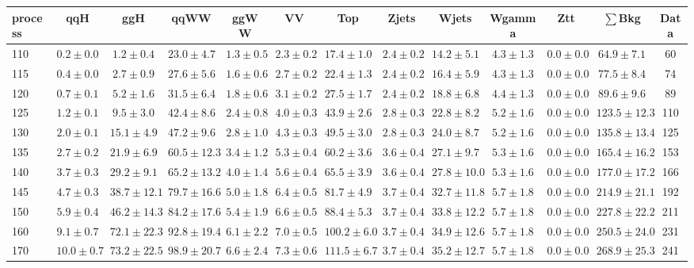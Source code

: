 \begin{table}
{%
 \tiny
 \begin{center}
 \begin{tabular}{l | c c | c c c c c c c c  | c c}
 \hline
 process & qqH & ggH & qqWW & ggWW & VV & Top & Zjets & Wjets & Wgamma & Ztt & $\sum$Bkg & Data \\
 \hline
110 & $0.2\pm0.0$ & $1.2\pm0.4$ & $23.0\pm4.7$ & $1.3\pm0.5$ & $2.3\pm0.2$ & $17.4\pm1.0$ & $2.4\pm0.2$ & $14.2\pm5.1$ & $4.3\pm1.3$ & $0.0\pm0.0$ & $64.9\pm7.1$ & 60 \\
115 & $0.4\pm0.0$ & $2.7\pm0.9$ & $27.6\pm5.6$ & $1.6\pm0.6$ & $2.7\pm0.2$ & $22.4\pm1.3$ & $2.4\pm0.2$ & $16.4\pm5.9$ & $4.3\pm1.3$ & $0.0\pm0.0$ & $77.5\pm8.4$ & 74 \\
120 & $0.7\pm0.1$ & $5.2\pm1.6$ & $31.5\pm6.4$ & $1.8\pm0.6$ & $3.1\pm0.2$ & $27.5\pm1.7$ & $2.4\pm0.2$ & $18.8\pm6.8$ & $4.4\pm1.3$ & $0.0\pm0.0$ & $89.6\pm9.6$ & 89 \\
125 & $1.2\pm0.1$ & $9.5\pm3.0$ & $42.4\pm8.6$ & $2.4\pm0.8$ & $4.0\pm0.3$ & $43.9\pm2.6$ & $2.8\pm0.3$ & $22.8\pm8.2$ & $5.2\pm1.6$ & $0.0\pm0.0$ & $123.5\pm12.3$ & 110 \\
130 & $2.0\pm0.1$ & $15.1\pm4.9$ & $47.2\pm9.6$ & $2.8\pm1.0$ & $4.3\pm0.3$ & $49.5\pm3.0$ & $2.8\pm0.3$ & $24.0\pm8.7$ & $5.2\pm1.6$ & $0.0\pm0.0$ & $135.8\pm13.4$ & 125 \\
135 & $2.7\pm0.2$ & $21.9\pm6.9$ & $60.5\pm12.3$ & $3.4\pm1.2$ & $5.3\pm0.4$ & $60.2\pm3.6$ & $3.6\pm0.4$ & $27.1\pm9.7$ & $5.3\pm1.6$ & $0.0\pm0.0$ & $165.4\pm16.2$ & 153 \\
140 & $3.7\pm0.3$ & $29.2\pm9.1$ & $65.2\pm13.2$ & $4.0\pm1.4$ & $5.6\pm0.4$ & $65.5\pm3.9$ & $3.6\pm0.4$ & $27.8\pm10.0$ & $5.3\pm1.6$ & $0.0\pm0.0$ & $177.0\pm17.2$ & 166 \\
145 & $4.7\pm0.3$ & $38.7\pm12.1$ & $79.7\pm16.6$ & $5.0\pm1.8$ & $6.4\pm0.5$ & $81.7\pm4.9$ & $3.7\pm0.4$ & $32.7\pm11.8$ & $5.7\pm1.8$ & $0.0\pm0.0$ & $214.9\pm21.1$ & 192 \\
150 & $5.9\pm0.4$ & $46.2\pm14.3$ & $84.2\pm17.6$ & $5.4\pm1.9$ & $6.6\pm0.5$ & $88.4\pm5.3$ & $3.7\pm0.4$ & $33.8\pm12.2$ & $5.7\pm1.8$ & $0.0\pm0.0$ & $227.8\pm22.2$ & 211 \\
160 & $9.1\pm0.7$ & $72.1\pm22.3$ & $92.8\pm19.4$ & $6.1\pm2.2$ & $7.0\pm0.5$ & $100.2\pm6.0$ & $3.7\pm0.4$ & $34.9\pm12.6$ & $5.7\pm1.8$ & $0.0\pm0.0$ & $250.5\pm24.0$ & 231 \\
170 & $10.0\pm0.7$ & $73.2\pm22.5$ & $98.9\pm20.7$ & $6.6\pm2.4$ & $7.3\pm0.6$ & $111.5\pm6.7$ & $3.7\pm0.4$ & $35.2\pm12.7$ & $5.7\pm1.8$ & $0.0\pm0.0$ & $268.9\pm25.3$ & 241 \\

\end{tabular}
\end{center}}
\end{table}
